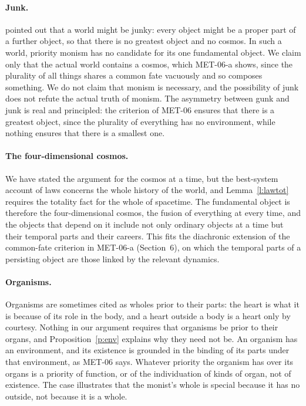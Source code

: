\documentclass{situationist-preprint}
\begin{document}
\paragraph{Junk.} \citet{Bohn2009} pointed out that a world might be junky: every object might be a proper part of a further object, so that there is no greatest object and no cosmos. In such a world, priority monism has no candidate for its one fundamental object. We claim only that the actual world contains a cosmos, which MET-06-a shows, since the plurality of all things shares a common fate vacuously and so composes something. We do not claim that monism is necessary, and the possibility of junk does not refute the actual truth of monism. The asymmetry between gunk and junk is real and principled: the criterion of MET-06 ensures that there is a greatest object, since the plurality of everything has no environment, while nothing ensures that there is a smallest one.

\paragraph{The four-dimensional cosmos.} We have stated the argument for the cosmos at a time, but the best-system account of laws concerns the whole history of the world, and Lemma~\ref{l:lawtot} requires the totality fact for the whole of spacetime. The fundamental object is therefore the four-dimensional cosmos, the fusion of everything at every time, and the objects that depend on it include not only ordinary objects at a time but their temporal parts and their careers. This fits the diachronic extension of the common-fate criterion in MET-06-a (Section~6), on which the temporal parts of a persisting object are those linked by the relevant dynamics.

\paragraph{Organisms.} Organisms are sometimes cited as wholes prior to their parts: the heart is what it is because of its role in the body, and a heart outside a body is a heart only by courtesy. Nothing in our argument requires that organisms be prior to their organs, and Proposition~\ref{p:env} explains why they need not be. An organism has an environment, and its existence is grounded in the binding of its parts under that environment, as MET-06 says. Whatever priority the organism has over its organs is a priority of function, or of the individuation of kinds of organ, not of existence. The case illustrates that the monist's whole is special because it has no outside, not because it is a whole.
\end{document}
